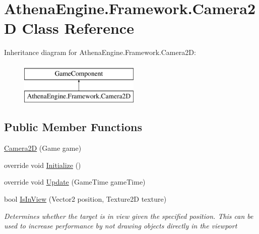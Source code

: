\hypertarget{class_athena_engine_1_1_framework_1_1_camera2_d}{\section{Athena\-Engine.\-Framework.\-Camera2\-D Class Reference}
\label{class_athena_engine_1_1_framework_1_1_camera2_d}
}
Inheritance diagram for Athena\-Engine.\-Framework.\-Camera2\-D\-:\begin{figure}[H]
\begin{center}
\leavevmode
\includegraphics[height=2.000000cm]{class_athena_engine_1_1_framework_1_1_camera2_d}
\end{center}
\end{figure}
\subsection*{Public Member Functions}
\begin{DoxyCompactItemize}
\item 
\hyperlink{class_athena_engine_1_1_framework_1_1_camera2_d_a5cabf8628e9a3bf76d22cc4630c8b9a7}{Camera2\-D} (Game game)
\item 
override void \hyperlink{class_athena_engine_1_1_framework_1_1_camera2_d_a404974721a2e52d38a8f2a929420efcb}{Initialize} ()
\begin{DoxyCompactList}\small\item\em \end{DoxyCompactList}\item 
override void \hyperlink{class_athena_engine_1_1_framework_1_1_camera2_d_a98b0a1814f87cb1c61cae210c667c94f}{Update} (Game\-Time game\-Time)
\item 
bool \hyperlink{class_athena_engine_1_1_framework_1_1_camera2_d_af59c31839e3b5f77266227a038c1e50c}{Is\-In\-View} (Vector2 position, Texture2\-D texture)
\begin{DoxyCompactList}\small\item\em Determines whether the target is in view given the specified position. This can be used to increase performance by not drawing objects directly in the viewport \end{DoxyCompactList}\end{DoxyCompactItemize}

